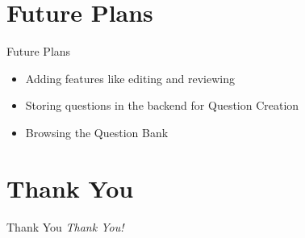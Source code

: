 \documentclass[10pt, a4paper]{beamer}
\begin{document}
\section{Future Plans}
\begin{frame}{Future Plans}
	\begin{itemize}
		\item Adding features like editing and reviewing
		\item Storing questions in the backend for Question Creation
		\item Browsing the Question Bank 
	\end{itemize}
\end{frame}


\section{Thank You}
\begin{frame}{Thank You}
	\centering \textit{\LARGE{Thank You!}}
\end{frame}
\end{document}
